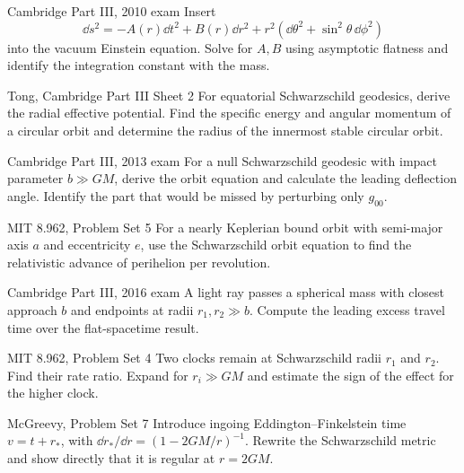 \begin{exercises}

\begin{exercise}{Cambridge Part III, 2010 exam}
Insert
\[
\dd s^2=-A(r)\dd t^2+B(r)\dd r^2
+r^2(\dd\theta^2+\sin^2\theta\,\dd\phi^2)
\]
into the vacuum Einstein equation.  Solve for \(A,B\) using asymptotic
flatness and identify the integration constant with the mass.
\end{exercise}

\begin{exercise}{Tong, Cambridge Part III Sheet 2}
For equatorial Schwarzschild geodesics, derive the radial effective potential.
Find the specific energy and angular momentum of a circular orbit and
determine the radius of the innermost stable circular orbit.
\end{exercise}

\begin{exercise}{Cambridge Part III, 2013 exam}
For a null Schwarzschild geodesic with impact parameter \(b\gg GM\), derive
the orbit equation and calculate the leading deflection angle.  Identify the
part that would be missed by perturbing only \(g_{00}\).
\end{exercise}

\begin{exercise}{MIT 8.962, Problem Set 5}
For a nearly Keplerian bound orbit with semi-major axis \(a\) and eccentricity
\(e\), use the Schwarzschild orbit equation to find the relativistic advance
of perihelion per revolution.
\end{exercise}

\begin{exercise}{Cambridge Part III, 2016 exam}
A light ray passes a spherical mass with closest approach \(b\) and endpoints
at radii \(r_1,r_2\gg b\).  Compute the leading excess travel time over the
flat-spacetime result.
\end{exercise}

\begin{exercise}{MIT 8.962, Problem Set 4}
Two clocks remain at Schwarzschild radii \(r_1\) and \(r_2\).  Find their rate
ratio.  Expand for \(r_i\gg GM\) and estimate the sign of the effect for the
higher clock.
\end{exercise}

\begin{exercise}{McGreevy, Problem Set 7}
Introduce ingoing Eddington--Finkelstein time
\(v=t+r_\ast\), with
\(\dd r_\ast/\dd r=(1-2GM/r)^{-1}\).  Rewrite the Schwarzschild metric and
show directly that it is regular at \(r=2GM\).
\end{exercise}


\end{exercises}
